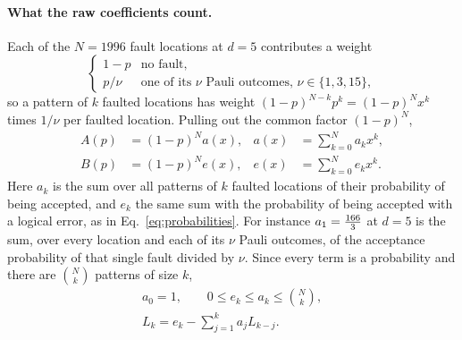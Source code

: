 \paragraph{What the raw coefficients count.} Each of the $N=1996$ fault locations at $d=5$ contributes a weight
\begin{equation}
 \begin{cases} 1-p & \text{no fault},\\[2pt] p/\nu & \text{one of its $\nu$ Pauli outcomes, } \nu\in\{1,3,15\},\end{cases}
 \label{eq:locationweight}
\end{equation}
so a pattern of $k$ faulted locations has weight $(1-p)^{N-k}p^k=(1-p)^Nx^k$ times $1/\nu$ per faulted location. Pulling out the common factor $(1-p)^N$,
\begin{equation}
 \begin{aligned}
 A(p)&=(1-p)^N a(x),& a(x)&=\sum_{k=0}^N a_kx^k,\\
 B(p)&=(1-p)^N e(x),& e(x)&=\sum_{k=0}^N e_kx^k.
 \end{aligned}
 \label{eq:raww}
\end{equation}
Here $a_k$ is the sum over all patterns of $k$ faulted locations of their probability of being accepted, and $e_k$ the same sum with the probability of being accepted with a logical error, as in Eq.~\eqref{eq:probabilities}. For instance $a_1=\frac{166}{3}$ at $d=5$ is the sum, over every location and each of its $\nu$ Pauli outcomes, of the acceptance probability of that single fault divided by $\nu$. Since every term is a probability and there are $\binom Nk$ patterns of size $k$,
\begin{equation}
 \begin{gathered}
 a_0=1,\qquad 0\le e_k\le a_k\le\binom Nk,\\
 L_k=e_k-\sum_{j=1}^k a_j L_{k-j}.
 \end{gathered}
 \label{eq:recursion}
\end{equation}

